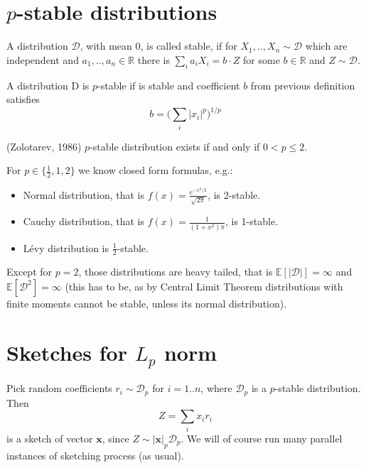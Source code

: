 \documentclass[11pt]{article}
\newcommand{\E}{{\mathbb E}}
\begin{document}

\section{$p$-stable distributions}
\begin{definition}
  A distribution $\mathcal{D}$, with mean $0$, is called stable, if for $X_1,..,X_n \sim \mathcal{D}$ which are independent and $a_1,..,a_n \in \mathbb{R}$ there is $\sum_i a_i X_i = b \cdot Z$ for some $b \in \mathbb{R}$ and $Z \sim \mathcal{D}$.
\end{definition}
\begin{definition}
  A distribution D is $p$-stable if is stable and coefficient $b$ from previous definition satisfies\[ b = \Big(\sum_i |x_i|^p\Big)^{1/p} \]
\end{definition}

\begin{remark}
(Zolotarev, 1986) $p$-stable distribution exists if and only if $0 < p \leq 2$.

For $p \in \{\frac{1}{2},1,2\}$ we know closed form formulas, e.g.:
\begin{itemize}
  \item Normal distribution, that is $f(x) = \frac{e^{-x^2/2}}{\sqrt{2 \pi}}$, is 2-stable.
  \item Cauchy distribution, that is $f(x) = \frac{1}{(1+x^2) \pi}$, is 1-stable.
  \item Lévy distribution is $\frac{1}{2}$-stable.
\end{itemize}
\end{remark}

\begin{remark}
  Except for $p=2$, those distributions are heavy tailed, that is $\E[|\mathcal{D}|] = \infty$ and $\E[\mathcal{D}^2] = \infty$ (this has to be, as by Central Limit Theorem distributions with finite moments cannot be stable, unless its normal distribution).
\end{remark}

\section{Sketches for $L_p$ norm \cite{DBLP:conf/focs/Indyk00}}

Pick random coefficients $r_i \sim \mathcal{D}_p$ for  $i = 1 .. n$, where $\mathcal{D}_p$ is a $p$-stable distribution. Then
$$Z = \sum_i x_i r_i$$ is a sketch of vector $\mathbf{x}$, since $Z \sim |\mathbf{x}|_p \mathcal{D}_p$. We will of course run many parallel instances of sketching process (as usual).
\end{document}
